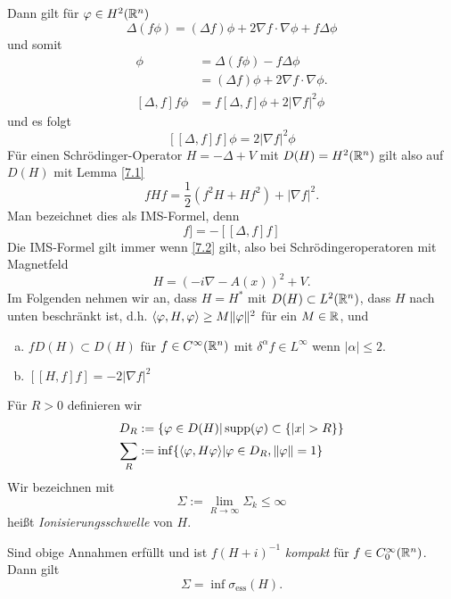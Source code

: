 \documentclass{mycourse}
\begin{document}
Dann gilt für $\varphi \in H^2(\mathbb{R}^n)$
\[
\Delta(f\phi) = (\Delta f) \phi + 2\nabla f \cdot \nabla \phi + f\Delta \phi
\]
und somit
\begin{align*}
[\Delta,f] \phi &= \Delta(f\phi) - f\Delta \phi\\
&= (\Delta f ) \phi + 2\nabla f \cdot \nabla \phi.\\
[\Delta,f] f \phi &= f[\Delta,f] \phi + 2 |\nabla f|^2 \phi
\end{align*}
und es folgt 
\[
[[\Delta,f] f] \phi = 2|\nabla f|^2 \phi
\]
Für einen Schrödinger-Operator $H=-\Delta + V$ mit $D(H)=H^2(\mathbb{R}^n)$ gilt also auf $D(H)$ mit Lemma \ref{7.1}
\begin{equation}
fHf = \frac{1}{2} (f^2 H+ Hf^2) + |\nabla f|^2. \tag{IMS} \label{IMS}
\end{equation}
Man bezeichnet dies als IMS-Formel, denn
\begin{equation} 
[[H,f]f] = -[[\Delta,f] f] \label{7.2}
\end{equation}
Die IMS-Formel gilt immer wenn \eqref{7.2} gilt, also bei Schrödingeroperatoren mit Magnetfeld
\[
H=(-i\nabla -A(x))^2 + V.
\]
Im Folgenden nehmen wir an, dass $H=H^*$ mit $D(H)\subset L^2(\mathbb{R}^n)$, dass $H$ nach unten beschränkt ist, d.h. $\langle \varphi, H, \varphi\rangle\ge M \| \varphi \|^2$ für ein $M\in \mathbb{R}$, und
\begin{enumerate}[a)]
\item $fD(H) \subset D(H)$ für $f\in C^\infty(\mathbb{R}^n)$ mit $\delta^\alpha f \in L^\infty$ wenn $|\alpha| \le 2$.
\item $[[H,f]f] = -2|\nabla f|^2$
\end{enumerate}

Für $R>0$ definieren wir
\begin{align*}
D_R&:= \{\phi \in D(H) | \supp(\phi) \subset \{ |x|>R\}\}\\
\sum_{R}&:=\inf\{\< \phi, H\phi\>| \phi \in D_R, \| \phi \| =1\}
\end{align*}
Wir bezeichnen mit
\[
\Sigma := \lim_{R\to \infty} \Sigma_k \le \infty
\]
heißt \emph{Ionisierungsschwelle} von $H$.
\begin{st}[Persson 1960]
Sind obige Annahmen erfüllt und ist $f(H+i)^{-1}$ \emph{kompakt} für $f\in C_0^\infty(\mathbb{R}^n)$. Dann gilt
\[
\Sigma= \inf \sigma_{\text{ess}}(H).
\] 
\end{st}
\end{document}
